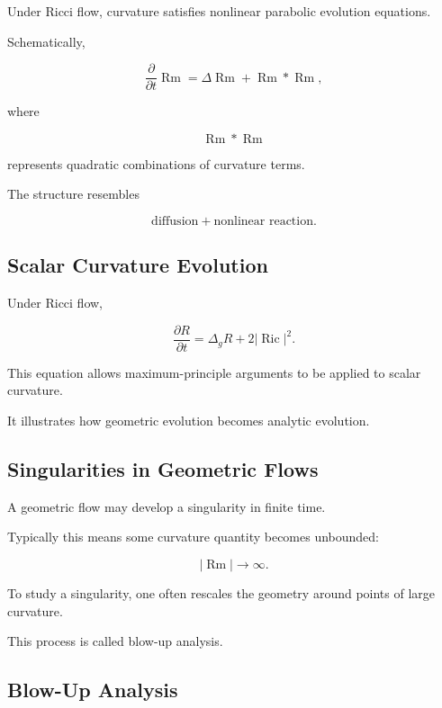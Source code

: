 Under Ricci flow, curvature satisfies nonlinear parabolic evolution
equations.

Schematically,

\[
\boxed{
\frac{\partial}{\partial t}
\operatorname{Rm}
=
\Delta\operatorname{Rm}
+
\operatorname{Rm}*\operatorname{Rm},
}
\]

where

\[
\operatorname{Rm}*\operatorname{Rm}
\]

represents quadratic combinations of curvature terms.

The structure resembles

\[
\boxed{
\text{diffusion}
+
\text{nonlinear reaction}.
}
\]

\subsection{Scalar Curvature Evolution}
\label{subsec:scalar-curvature-evolution}

Under Ricci flow,

\[
\boxed{
\frac{\partial R}{\partial t}
=
\Delta_gR
+
2|\operatorname{Ric}|^2.
}
\]

This equation allows maximum-principle arguments to be applied to scalar
curvature.

It illustrates how geometric evolution becomes analytic evolution.

\subsection{Singularities in Geometric Flows}
\label{subsec:geometric-flow-singularities}

A geometric flow may develop a singularity in finite time.

Typically this means some curvature quantity becomes unbounded:

\[
\boxed{
|\operatorname{Rm}|
\to\infty.
}
\]

To study a singularity, one often rescales the geometry around points of
large curvature.

This process is called blow-up analysis.

\subsection{Blow-Up Analysis}
\label{subsec:geometric-blow-up-analysis}

